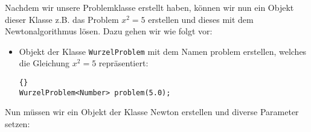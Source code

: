 \documentclass[a4paper,11pt]{article}
\theoremstyle{definition}
\begin{document}
\noindent
Nachdem wir unsere Problemklasse erstellt haben, können wir nun ein
Objekt dieser Klasse z.B. das Problem $x^2=5$ erstellen und dieses mit
dem Newtonalgorithmus lösen. Dazu gehen wir wie folgt vor:
\begin{itemize}
  \item Objekt der Klasse \lstinline{WurzelProblem} mit dem Namen
    \glqq problem\grqq{} erstellen, welches die Gleichung $x^2=5$
    repräsentiert:

  {\footnotesize{\begin{lstlisting}{}
WurzelProblem<Number> problem(5.0);
\end{lstlisting}}}
\end{itemize}

\noindent
Nun müssen wir ein Objekt der Klasse Newton erstellen und diverse
Parameter setzen:
\end{document}
